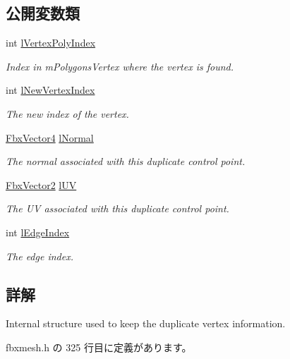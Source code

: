\subsection*{公開変数類}
\begin{DoxyCompactItemize}
\item 
int \hyperlink{class_fbx_mesh_1_1_duplicate_vertex_afe223b4087156f6779fc5883dc56332c}{l\+Vertex\+Poly\+Index}
\begin{DoxyCompactList}\small\item\em Index in m\+Polygons\+Vertex where the vertex is found. \end{DoxyCompactList}\item 
int \hyperlink{class_fbx_mesh_1_1_duplicate_vertex_a0e9792d44731dde65ead70a148dd478e}{l\+New\+Vertex\+Index}
\begin{DoxyCompactList}\small\item\em The new index of the vertex. \end{DoxyCompactList}\item 
\hyperlink{class_fbx_vector4}{Fbx\+Vector4} \hyperlink{class_fbx_mesh_1_1_duplicate_vertex_ad8fcfba1eaea34a1090eeb78c0f18b4f}{l\+Normal}
\begin{DoxyCompactList}\small\item\em The normal associated with this duplicate control point. \end{DoxyCompactList}\item 
\hyperlink{class_fbx_vector2}{Fbx\+Vector2} \hyperlink{class_fbx_mesh_1_1_duplicate_vertex_a8788aaa86c459f069d1f90bd27acbee0}{l\+UV}
\begin{DoxyCompactList}\small\item\em The UV associated with this duplicate control point. \end{DoxyCompactList}\item 
int \hyperlink{class_fbx_mesh_1_1_duplicate_vertex_aae381ae0863a047fa1e9bd081f137076}{l\+Edge\+Index}
\begin{DoxyCompactList}\small\item\em The edge index. \end{DoxyCompactList}\end{DoxyCompactItemize}


\subsection{詳解}
Internal structure used to keep the duplicate vertex information. 

 fbxmesh.\+h の 325 行目に定義があります。



